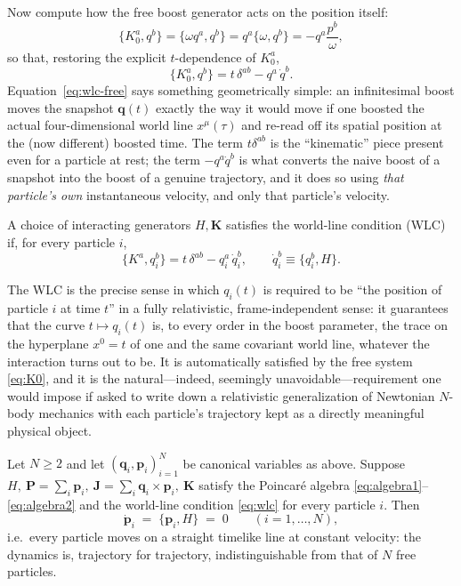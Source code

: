 Now compute how the free boost generator acts on the position itself:
\begin{equation}
\{K_0^a,q^b\} = \{\omega q^a,q^b\} = q^a\{\omega,q^b\} = -q^a\frac{p^b}{\omega},
\end{equation}
so that, restoring the explicit $t$-dependence of $K_0^a$,
\begin{equation}
\{K_0^a,q^b\} = t\,\delta^{ab} - q^a\,\dot q^b .
\label{eq:wlc-free}
\end{equation}
Equation~\eqref{eq:wlc-free} says something geometrically simple: an
infinitesimal boost moves the snapshot ${\bm q}(t)$ exactly the way it would move
if one boosted the actual four-dimensional world line $x^\mu(\tau)$ and re-read
off its spatial position at the (now different) boosted time. The term
$t\delta^{ab}$ is the ``kinematic'' piece present even for a particle at rest;
the term $-q^a\dot q^b$ is what converts the naive boost of a snapshot into the
boost of a genuine trajectory, and it does so using \emph{that particle's own}
instantaneous velocity, and only that particle's velocity.

\begin{definition}
A choice of interacting generators $H,{\bm K}$ satisfies the world-line condition
    (WLC) if, for every particle $i$,
\begin{equation}
\{K^a,q_i^b\} = t\,\delta^{ab} - q_i^a\,\dot q_i^b, \qquad \dot q_i^b \equiv \{q_i^b,H\}.
\label{eq:wlc}
\end{equation}
\end{definition}

The WLC is the precise sense in which $q_i(t)$ is required to be ``the position
of particle $i$ at time $t$'' in a fully relativistic, frame-independent sense:
it guarantees that the curve $t\mapsto q_i(t)$ is, to every order in the boost
parameter, the trace on the hyperplane $x^0=t$ of one and the same covariant
world line, whatever the interaction turns out to be. It is automatically
satisfied by the free system \eqref{eq:K0}, and it is the natural---indeed,
seemingly unavoidable---requirement one would impose if asked to write down a
relativistic generalization of Newtonian $N$-body mechanics with each
particle's trajectory kept as a directly meaningful physical object.

\begin{theorem}
\label{thm:noint}
Let $N\ge 2$ and let $({\bm q}_i,{\bm p}_i)_{i=1}^N$ be canonical variables as above.
    Suppose $H,\ {\bm P}=\sum_i{\bm p}_i,\ {\bm J}=\sum_i{\bm q}_i\times{\bm p}_i,\ {\bm K}$ satisfy
    the Poincar\'e algebra \eqref{eq:algebra1}--\eqref{eq:algebra2} and the
    world-line condition \eqref{eq:wlc} for every particle $i$. Then
\begin{equation}
\dot{{\bm p}}_i \;=\; \{{\bm p}_i,H\} \;=\; 0 \qquad (i=1,\dots,N),
\end{equation}
i.e.\ every particle moves on a straight timelike line at constant velocity:
    the dynamics is, trajectory for trajectory, indistinguishable from that of
    $N$ free particles.
\end{theorem}

